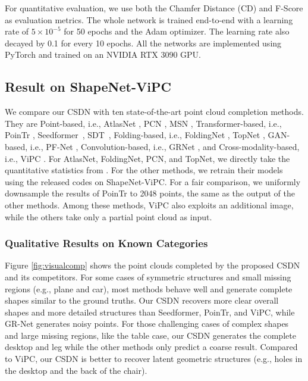 For quantitative evaluation, we use both the Chamfer Distance (CD) and F-Score as evaluation metrics. The whole network is trained end-to-end with a learning rate of $5 \times 10^{-5}$ for 50 epochs and the Adam optimizer. The learning rate also decayed by 0.1 for every 10 epochs. All the networks are implemented using PyTorch and trained on an NVIDIA RTX 3090 GPU.

\subsection{Result on ShapeNet-ViPC}
\label{subsec:comparison}
We compare our CSDN with ten state-of-the-art point cloud completion methods. They are Point-based, i.e., AtlasNet \cite{groueix2018papier}, PCN \cite{yuan2018pcn}, MSN \cite{liu2020morphing}, Transformer-based, i.e., PoinTr \cite{yu2021pointr}, Seedformer~\cite{zhou2022seedformer}, SDT~\cite{zhang2022point}, Folding-based, i.e., FoldingNet \cite{yang2018foldingnet}, TopNet \cite{tchapmi2019topnet}, GAN-based, i.e., PF-Net \cite{huang2020pf},  Convolution-based, i.e., GRNet \cite{xie2020grnet}, and Cross-modality-based, i.e., ViPC \cite{zhang2021view}. For AtlasNet, FoldingNet, PCN, and TopNet, we directly take the quantitative statistics from \cite{zhang2021view}. For the other methods, we retrain their models using the released codes on ShapeNet-ViPC. 
For a fair comparison, we uniformly downsample the results of PoinTr to 2048 points, the same as the output of the other methods. Among these methods, ViPC also exploits an additional image, while the others take only a partial point cloud as input.

\subsubsection{Qualitative Results on Known Categories}
Figure \ref{fig:visualcomp} shows the point clouds completed by the proposed CSDN and its competitors. 
For some cases of symmetric structures and small missing regions (e.g., plane and car), most methods behave well and generate complete shapes similar to the ground truths. Our CSDN recovers more clear overall shapes and more detailed structures than Seedformer, PoinTr, and ViPC, while GR-Net generates noisy points. For those challenging cases of complex shapes and large missing regions, like the table case, our CSDN generates the complete desktop and leg while the other methods only predict a coarse result. Compared to ViPC, 
our CSDN is better to recover latent geometric structures (e.g., holes in the desktop and the back of the chair).


